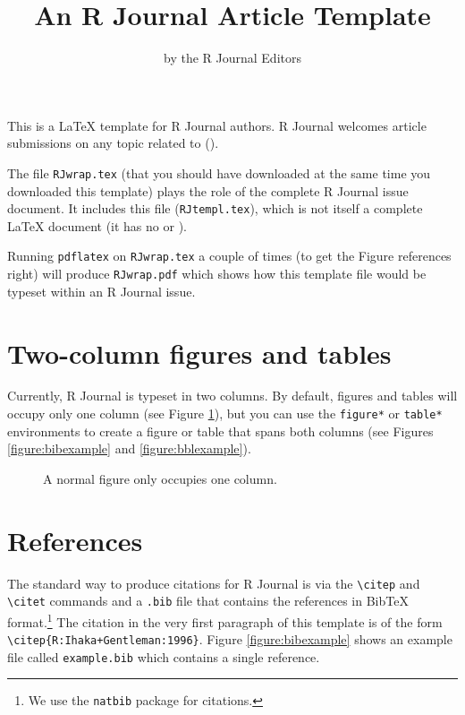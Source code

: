 \title{An R Journal Article Template}
\author{by the R Journal Editors}

\maketitle

This is a \LaTeX{} template for R Journal authors.
R Journal welcomes article submissions on any topic related to 
\R{} (\citep{R:Ihaka+Gentleman:1996}).

The file {\tt RJwrap.tex} (that you should have downloaded
at the same time you downloaded this template) plays the role
of the complete R Journal issue document.  It includes this file
({\tt RJtempl.tex}), which is not itself a complete
\LaTeX{} document (it has no \verb|| or
\verb||).

Running {\tt pdflatex} on {\tt RJwrap.tex} a couple of times
(to get the Figure references right) will produce
{\tt RJwrap.pdf} which shows how this template file would be 
typeset within an R Journal issue.

\section*{Two-column figures and tables}

Currently, R Journal is typeset in two columns.
By default, figures and tables will occupy only one
column (see Figure \ref{figure:onecolfig}), 
but you can use the \verb|figure*| or
\verb|table*| environments to create a figure or
table that spans both columns (see Figures \ref{figure:bibexample}
and \ref{figure:bblexample}).

\begin{figure}
\vspace*{.1in}
\caption{\label{figure:onecolfig}
A normal figure only occupies one column.}
\end{figure}

\section*{References}

The standard way to produce citations for R Journal is via the 
\verb|\citep| and \verb|\citet| commands 
and a {\tt .bib} file that contains the 
references in {\sc Bib}\TeX{} format.\footnote{We use the {\tt natbib}
package for citations.}  The citation in the very first 
paragraph of this template is of the form
\verb|\citep{R:Ihaka+Gentleman:1996}|.  Figure \ref{figure:bibexample}
shows an example file called {\tt example.bib} which contains 
a single reference.  

